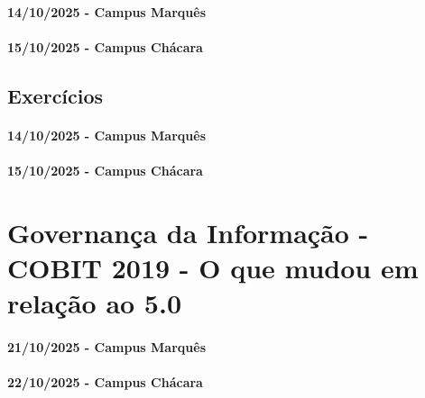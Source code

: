 \documentclass[
]{book}
\begin{document}
\subsubsection*{14/10/2025 - Campus Marquês}\label{campus-marquuxeas-12}

\subsubsection*{15/10/2025 - Campus Chácara}\label{campus-chuxe1cara-12}

\section{Exercícios}\label{exercuxedcios-8}

\subsubsection*{14/10/2025 - Campus Marquês}\label{campus-marquuxeas-13}

\subsubsection*{15/10/2025 - Campus Chácara}\label{campus-chuxe1cara-13}

\chapter{Governança da Informação - COBIT 2019 - O que mudou em relação ao 5.0}\label{governanuxe7a-da-informauxe7uxe3o---cobit-2019---o-que-mudou-em-relauxe7uxe3o-ao-5.0}

\subsubsection*{21/10/2025 - Campus Marquês}\label{campus-marquuxeas-14}

\subsubsection*{22/10/2025 - Campus Chácara}\label{campus-chuxe1cara-14}
\end{document}
